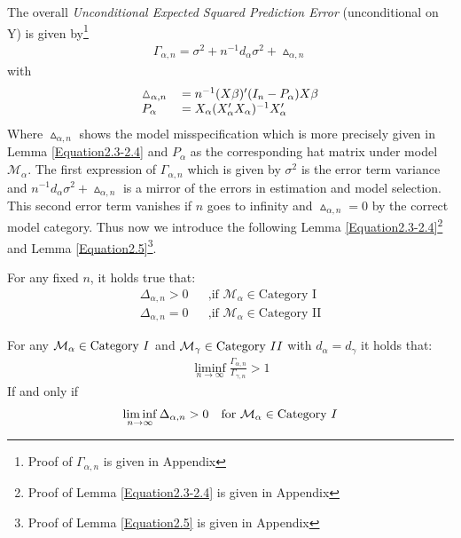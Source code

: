 \documentclass[Research_Module_ES.tex]{subfiles}
\begin{document}
The overall \textit{Unconditional Expected Squared Prediction Error} (unconditional on Y) is given by\footnote{Proof of $\Gamma_{\alpha,n}$ is given in Appendix } 
\begin{align*}
\Gamma_{\alpha,n}=\sigma^2+n^{-1}d_\alpha\sigma^2+\vartriangle_{\alpha,n}
\end{align*}
with
\begin{align*}
\begin{tabular}{ll}
$\vartriangle_{\alpha,n}$&$=n^{-1}(X\beta)^\prime(I_n-P_\alpha)X\beta$\\
$P_\alpha$&$=X_\alpha(X_\alpha^\prime X_\alpha)^{-1}X_\alpha^\prime$
\end{tabular}
\end{align*}
Where $\vartriangle_{\alpha,n}$ shows the model misspecification which is more precisely given in Lemma \ref{Equation2.3-2.4} and $P_\alpha$ as the corresponding hat matrix under model $\mathcal{M}_\alpha.$ The first expression of $\Gamma_{\alpha,n}$ which is given by $\sigma^2$ is the error term variance and $n^{-1}d_\alpha\sigma^2+\vartriangle_{\alpha,n}$ is a mirror of the errors in estimation and model selection. This second error term vanishes if $n$ goes to infinity and $\vartriangle_{\alpha,n}=0$ by the correct model category. Thus now we introduce the following Lemma \ref{Equation2.3-2.4}\footnote{Proof of Lemma \ref{Equation2.3-2.4} is given in Appendix }
and Lemma \ref{Equation2.5}\footnote{Proof of Lemma \ref{Equation2.5} is given in Appendix }.

\begin{lemma}
	\label{Equation2.3-2.4}
	For any fixed $n$, it holds true that:
	\begin{align*}
		&&\Delta_{\alpha,n}>0 &&\text{,if } \mathcal{M}_\alpha\in\text{Category I}&&\\
		&&\Delta_{\alpha,n}=0 &&\text{,if } \mathcal{M}_\alpha\in\text{Category II}&&
	\end{align*}
\end{lemma}


\begin{lemma}
	\label{Equation2.5}
	For any $\mathcal{M}_\alpha\in\text{Category}~\RM{1}$ and $\mathcal{M}_\gamma\in\text{Category}~\RM{2}$ with $d_\alpha=d_\gamma$ it holds that:
	\begin{align*}
	\liminf_{n\rightarrow\infty}\frac{\Gamma_{\alpha,n}}{\Gamma_{\gamma,n}}>1
	\end{align*}
	If and only if
	\begin{align}
	\liminf_{n\rightarrow\infty}\Delta_{\alpha,n}>0 \text{~~~for~}\mathcal{M}_\alpha\in\text{Category}~\RM{1} \label{liminf_condition}
	\end{align}
\end{lemma}
\end{document}
